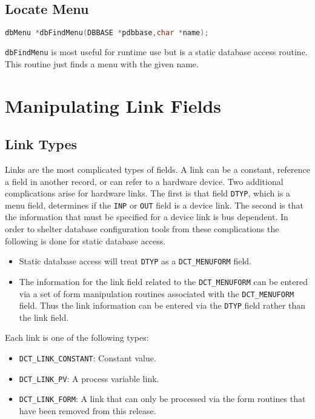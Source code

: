 \subsection{Locate Menu}

\begin{lstlisting}[language=C]
dbMenu *dbFindMenu(DBBASE *pdbbase,char *name);
\end{lstlisting}

\verb|dbFindMenu| is most useful for runtime use but is a static database access routine.
This routine just finds a menu with the given name.

\section{Manipulating Link Fields}

\subsection{Link Types}

Links are the most complicated types of fields.
A link can be a constant, reference a field in another record, or can refer to a hardware device.
Two additional complications arise for hardware links.
The first is that field \verb|DTYP|, which is a menu field, determines if the \verb|INP| or \verb|OUT| field is a device link.
The second is that the information that must be specified for a device link is bus dependent.
In order to shelter database configuration tools from these complications the following is done for static database access.

\begin{itemize}
\item Static database access will treat \verb|DTYP| as a \verb|DCT_MENUFORM| field.

\item The information for the link field related to the \verb|DCT_MENUFORM| can be entered via a set of form manipulation routines associated with the \verb|DCT_MENUFORM| field.
Thus the link information can be entered via the \verb|DTYP| field rather than the link field.

\end{itemize}

Each link is one of the following types:

\begin{itemize}
\item {}\verb|DCT_LINK_CONSTANT|: Constant value.

\item {}\verb|DCT_LINK_PV|: A process variable link.

\item {}\verb|DCT_LINK_FORM|: A link that can only be processed via the form routines that have been removed from this release.

\end{itemize}

